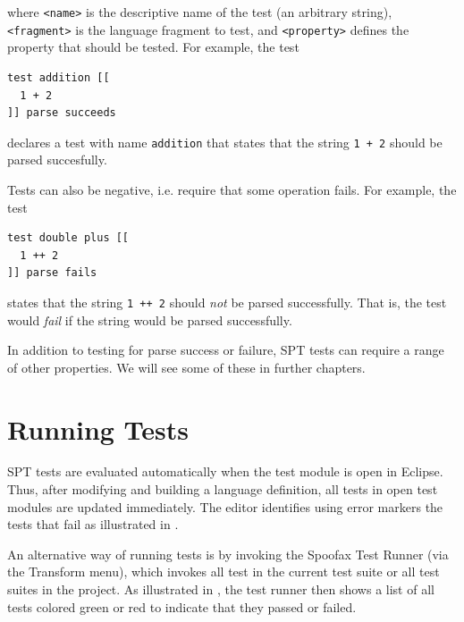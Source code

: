 where \texttt{<name>} is the descriptive name of the test (an arbitrary string),
\texttt{<fragment>} is the language fragment to test, and \texttt{<property>}
defines the property that should be tested.
For example, the test

\begin{lstlisting}[language=SPT]
test addition [[
  1 + 2
]] parse succeeds
\end{lstlisting}

declares a test with name \texttt{addition} that states that the string
\texttt{1 + 2} should be parsed succesfully.
 
Tests can also be negative, i.e. require that some operation fails. For example, 
the test

\begin{lstlisting}[language=SPT]
test double plus [[
  1 ++ 2
]] parse fails
\end{lstlisting}

states that the string \texttt{1 ++ 2} should \emph{not} be parsed successfully.
That is, the test would \emph{fail} if the string would be parsed successfully.

In addition to testing for parse success or failure, SPT tests can require a
range of other properties. We will see some of these in further chapters.

\section{Running Tests}

SPT tests are evaluated automatically when the test module is open in Eclipse.
Thus, after modifying and building a language definition, all tests in open test
modules are updated immediately.
The editor identifies using error markers the tests that fail as illustrated in 
.

An alternative way of running tests is by invoking the Spoofax Test Runner (via
the Transform menu), which invokes all test in the current test suite or all
test suites in the project. As illustrated in , the
test runner then shows a list of all tests colored green or red to indicate that
they passed or failed.

